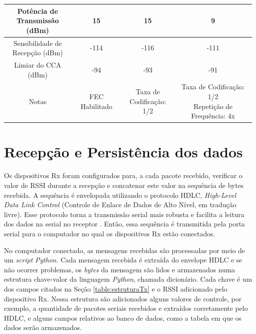 \begin{table}[H]
\begin{tabular}{|c c c c|}
            \makecell{Potência de                                     \\Transmissão (dBm)         } & 15      & 15                       & 9        \\\hline
            \makecell{Sensibilidade de                                \\Recepção (dBm)       } & -114    & -116                     & -111     \\\hline
            \makecell{Limiar do CCA                                   \\(dBm)                   } & -94     & -93                      & -91      \\ \hline
            Notas     & FEC Habilitado & \makecell{Taxa de            \\Codificação: 1/2} & \makecell{Taxa de Codificação: 1/2\\Repetição de Frequência: 4x} \\ \hline
            \hline
      \end{tabular}
      \label{table:config}
\end{table}

\section{Recepção e Persistência dos dados}
Os dispositivos Rx foram configurados para, a cada pacote recebido, verificar o valor de RSSI durante a recepção e concatenar este valor na sequência de bytes recebida. A sequência é envelopada utilizando o protocolo HDLC, \emph{High-Level Data Link Control} (Controle de Enlace de Dados de Alto Nível, em tradução livre). Esse protocolo torna a transmissão serial mais robusta e facilita a leitura dos dados na serial no receptor \cite{tanembaum2011}. Então, essa sequência é transmitida pela porta serial para o computador no qual os dispositivos Rx estão conectados.

No computador conectado, as mensagens recebidas são processadas por  meio de um \emph{script Python}. Cada mensagem recebida é extraída do envelope HDLC e se não ocorrer problemas, os \emph{bytes} da mensagem são lidos e armazenados numa estrutura chave-valor da linguagem \emph{Python}, chamada dicionário. Cada chave é um dos campos citados na Seção \ref{table:estruturaTx} e o RSSI adicionado pelo dispositivo Rx. Nessa estrutura são adicionados alguns valores de controle, por exemplo, a quantidade de pacotes seriais recebidos e extraídos corretamente pelo HDLC, e alguns campos relativos ao banco de dados, como a tabela em que os dados serão armazenados.

